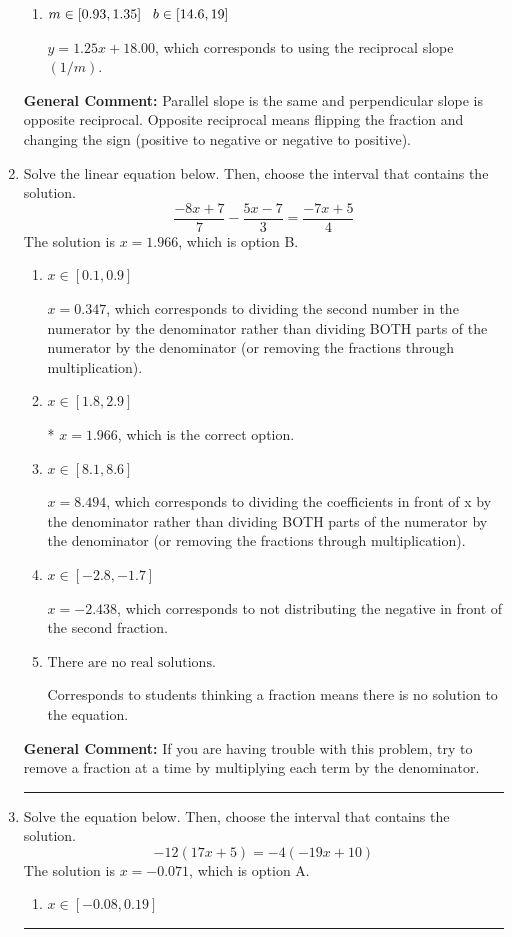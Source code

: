 \documentclass{extbook}[14pt]
\newcommand{\litem}[1]{\item #1

\rule{\textwidth}{0.4pt}}
\begin{document}
\begin{enumerate}
{\begin{enumerate}[label=\Alph*.]
 $y = 0.80x + 20.00$, which corresponds to correct slope and mis-distributing while simplifying to slope-intercept form.
\item \( m \in [0.93, 1.35] \hspace*{3mm} b \in [14.6, 19] \)

 $y = 1.25x + 18.00$, which corresponds to using the reciprocal slope $(1/m)$.
\end{enumerate}

\textbf{General Comment:} Parallel slope is the same and perpendicular slope is opposite reciprocal. Opposite reciprocal means flipping the fraction and changing the sign (positive to negative or negative to positive).
}
\litem{
Solve the linear equation below. Then, choose the interval that contains the solution.
\[ \frac{-8x + 7}{7} - \frac{5x -7}{3} = \frac{-7x + 5}{4} \]The solution is \( x = 1.966 \), which is option B.\begin{enumerate}[label=\Alph*.]
\item \( x \in [0.1, 0.9] \)

 $x = 0.347$, which corresponds to dividing the second number in the numerator by the denominator rather than dividing BOTH parts of the numerator by the denominator (or removing the fractions through multiplication).
\item \( x \in [1.8, 2.9] \)

* $x = 1.966$, which is the correct option.
\item \( x \in [8.1, 8.6] \)

 $x = 8.494$, which corresponds to dividing the coefficients in front of x by the denominator rather than dividing BOTH parts of the numerator by the denominator (or removing the fractions through multiplication).
\item \( x \in [-2.8, -1.7] \)

 $x = -2.438$, which corresponds to not distributing the negative in front of the second fraction.
\item \( \text{There are no real solutions.} \)

Corresponds to students thinking a fraction means there is no solution to the equation.
\end{enumerate}

\textbf{General Comment:} If you are having trouble with this problem, try to remove a fraction at a time by multiplying each term by the denominator.
}
\litem{
Solve the equation below. Then, choose the interval that contains the solution.
\[ -12(17x + 5) = -4(-19x + 10) \]The solution is \( x = -0.071 \), which is option A.\begin{enumerate}[label=\Alph*.]
\item \( x \in [-0.08, 0.19] \)


\end{enumerate}}
\end{enumerate}
\end{document}
